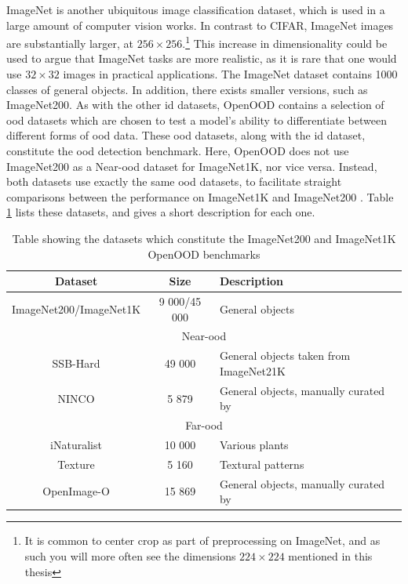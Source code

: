 \documentclass[UKenglish]{uiomasterthesis} %
\theoremstyle{definition}
\begin{document}
ImageNet is another ubiquitous image classification dataset, which is used in a large amount of computer vision works. In contrast to CIFAR, ImageNet images are substantially larger, at $256 \times 256$.\footnote{It is common to center crop as part of preprocessing on ImageNet, and as such you will more often see the dimensions $224 \times 224$ mentioned in this thesis} This increase in dimensionality could be used to argue that ImageNet tasks are more realistic, as it is rare that one would use $32 \times 32$ images in practical applications. The ImageNet dataset contains 1000 classes of general objects. In addition, there exists smaller versions, such as ImageNet200. As with the other \ac{id} datasets, OpenOOD contains a selection of \ac{ood} datasets which are chosen to test a model's ability to differentiate between different forms of \ac{ood} data. These \ac{ood} datasets, along with the \ac{id} dataset, constitute the \ac{ood} detection benchmark. Here, OpenOOD does not use ImageNet200 as a Near-\ac{ood} dataset for ImageNet1K, nor vice versa. Instead, both datasets use exactly the same \ac{ood} datasets, to facilitate straight comparisons between the performance on ImageNet1K and ImageNet200 \cite{openood15}. Table \ref{table:imagenet200} lists these datasets, and gives a short description for each one.

\begin{table}[hbtp]
\begin{center}
\begin{tabular}{ |c|c|l| } 
    \hline
    Dataset & Size & Description \\
    \hline
    \rowcolor{id!50}
    ImageNet200/ImageNet1K & 9 000/45 000 & General objects \\ 
    \hline
    \hline
    \multicolumn{3}{|c|}{Near-\ac{ood}} \\
    \hline
    \rowcolor{near!50}
    SSB-Hard & 49 000 & General objects taken from ImageNet21K \\ 
    \rowcolor{near!50}
    NINCO & 5 879 & General objects, manually curated by \cite{bitterwolf2023ninco} \\ 
    \hline
    \hline
    \multicolumn{3}{|c|}{Far-\ac{ood}} \\
    \hline
    \rowcolor{far!50}
    iNaturalist & 10 000 & Various plants \\ 
    \rowcolor{far!50}
    Texture & 5 160 & Textural patterns \\ 
    \rowcolor{far!50}
    OpenImage-O & 15 869 & General objects, manually curated by \cite{vim} \\ 
    \hline
    \end{tabular}
    \caption[ImageNet benchmark datasets]{Table showing the datasets which constitute the ImageNet200 and ImageNet1K OpenOOD benchmarks}
    \label{table:imagenet200}
\end{center}
\end{table}
\end{document}
